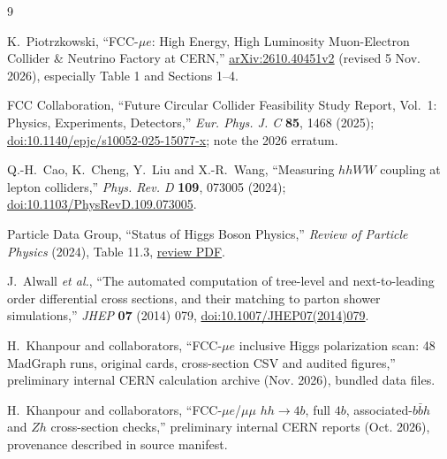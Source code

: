 \documentclass[12pt,a4paper]{article}
\begin{document}
\begin{thebibliography}{9}\setlength{\itemsep}{1pt}\small
	
 K.~Piotrzkowski, ``FCC-$\mu e$: High Energy, High Luminosity Muon-Electron Collider \& Neutrino Factory at CERN,'' \href{https://arxiv.org/abs/2610.40451}{arXiv:2610.40451v2} (revised 5 Nov. 2026), especially Table 1 and Sections 1--4.

 FCC Collaboration, ``Future Circular Collider Feasibility Study Report, Vol.~1: Physics, Experiments, Detectors,'' \emph{Eur. Phys. J. C} \textbf{85}, 1468 (2025); \href{https://doi.org/10.1140/epjc/s10052-025-15077-x}{doi:10.1140/epjc/s10052-025-15077-x}; note the 2026 erratum.

 Q.-H.~Cao, K.~Cheng, Y.~Liu and X.-R.~Wang, ``Measuring $hhWW$ coupling at lepton colliders,'' \emph{Phys. Rev. D} \textbf{109}, 073005 (2024); \href{https://doi.org/10.1103/PhysRevD.109.073005}{doi:10.1103/PhysRevD.109.073005}.

 Particle Data Group, ``Status of Higgs Boson Physics,'' \emph{Review of Particle Physics} (2024), Table 11.3, \href{https://pdgweb.lbl.gov/2024/reviews/rpp2024-rev-higgs-boson.pdf}{review PDF}.

 J.~Alwall \emph{et al.}, ``The automated computation of tree-level and next-to-leading order differential cross sections, and their matching to parton shower simulations,'' \emph{JHEP} \textbf{07} (2014) 079, \href{https://doi.org/10.1007/JHEP07(2014)079}{doi:10.1007/JHEP07(2014)079}.

 H.~Khanpour and collaborators, ``FCC-$\mu e$ inclusive Higgs polarization scan: 48 MadGraph runs, original cards, cross-section CSV and audited figures,'' preliminary internal CERN calculation archive (Nov. 2026), bundled data files.

 H.~Khanpour and collaborators, ``FCC-$\mu e$/$\mu\mu$ $hh\to4b$, full $4b$, associated-$b\bar bh$ and $Zh$ cross-section checks,'' preliminary internal CERN reports (Oct. 2026), provenance described in source manifest.

\end{thebibliography}



\end{document}
